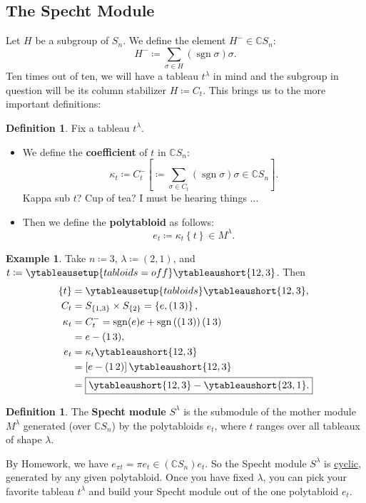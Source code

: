 \documentclass[12pt]{article}
\newcommand{\cx}{\mathbb{C}}
\newcommand\paren[1]{\left( #1 \right)}
\newcommand\setb[1]{\left \{ #1 \right \}}
\theoremstyle{definition}
\newtheorem{definition}[theorem]{Definition}
\newtheorem{example}{Example}[section]
\DeclareMathOperator\sgn{sgn}
\begin{document}
\subsection{The Specht Module}
Let $H$ be a subgroup of $S_n$. We define the element $H^- \in \cx S_n$:
\begin{equation}
    H^- \coloneqq  \sum\limits_{\sigma \in H} \paren{ \sgn \sigma } \sigma.
\end{equation}
Ten times out of ten, we will have a tableau $t^{\lambda}$ in mind and the subgroup in question will be its column stabilizer $H \coloneqq  C_t$. This brings us to the more important definitions:
\begin{definition}
    Fix a tableau $t^{\lambda}$.
    \begin{itemize}
        \item We define the \textbf{coefficient} of $t$ in $\cx S_n$:
        \begin{equation}
            \kappa_t \coloneqq  C_t^- \left[ \coloneqq  \sum\limits_{\sigma \in C_t} \paren{ \sgn \sigma } \sigma \in \cx S_n \right].
        \end{equation}
        Kappa sub $t$? Cup of tea? I must be hearing things $\dotsc$
        \item Then we define the \textbf{polytabloid} as follows:
        \begin{equation}
            e_t \coloneqq  \kappa_t \setb{ t } \in M^{\lambda}.
        \end{equation}
    \end{itemize}
\end{definition}
\begin{example}
    Take $n \coloneqq  3$, $\lambda \coloneqq  (2,1)$, and $t \coloneqq  \ytableausetup{tabloids=off} \ytableaushort{12,3}$. Then 
    \begin{align*}
        \setb{ t } & = \ytableausetup{tabloids} \ytableaushort{12,3}, \\
        C_t & = S_{ \setb{1,3} } \times S_{ \setb{2} } = \setb{ e , (1\,3) }, \\
        \kappa_t & = C_t^- = \sgn(e)e + \sgn \paren{ (1\,3) } (1\,3) \\
        & = e - (1\,3), \\
        e_t & = \kappa_t \ytableaushort{12,3} \\
        & = \left[ e - (1\,2) \right] \ytableaushort{12,3} \\
        & = \boxed{ \ytableaushort{12,3} - \ytableaushort{23,1}. }
    \end{align*}
\end{example}
\begin{definition}
    The \textbf{Specht module} $S^{\lambda}$ is the submodule of the mother module $M^{\lambda}$ generated (over $\cx S_n$) by the polytabloids $e_t$, where $t$ ranges over all tableaux of shape $\lambda$. 
\end{definition}
By Homework, we have $e_{\pi t} = \pi e_t \in \paren{ \cx S_n } e_t$. So the Specht module $S^{\lambda}$ is \underline{cyclic}, generated by any given polytabloid. Once you have fixed $\lambda$, you can pick your favorite tableau $t^{\lambda}$ and build your Specht module out of the one polytabloid $e_t$.
\end{document}
